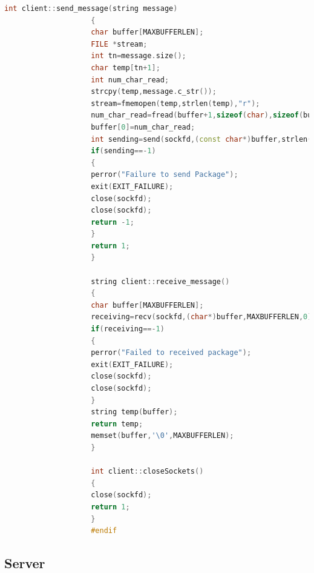 \documentclass[11pt]{article}
\begin{document}
\begin{lstlisting}[language=C++]
					int client::send_message(string message)
					{
					char buffer[MAXBUFFERLEN];
					FILE *stream;
					int tn=message.size();
					char temp[tn+1];
					int num_char_read;
					strcpy(temp,message.c_str());
					stream=fmemopen(temp,strlen(temp),"r");
					num_char_read=fread(buffer+1,sizeof(char),sizeof(buffer),stream);
					buffer[0]=num_char_read;
					int sending=send(sockfd,(const char*)buffer,strlen(buffer)+1,0);
					if(sending==-1)
					{
					perror("Failure to send Package");
					exit(EXIT_FAILURE);
					close(sockfd);
					close(sockfd);
					return -1;
					}
					return 1;
					}
					
					string client::receive_message()
					{
					char buffer[MAXBUFFERLEN];
					receiving=recv(sockfd,(char*)buffer,MAXBUFFERLEN,0);
					if(receiving==-1)
					{
					perror("Failed to received package");
					exit(EXIT_FAILURE);
					close(sockfd);
					close(sockfd);
					} 
					string temp(buffer);
					return temp;
					memset(buffer,'\0',MAXBUFFERLEN);
					}
					
					int client::closeSockets()
					{
					close(sockfd);
					return 1;
					}
					#endif
				\end{lstlisting}	
		\subsection{Server}
\end{document}
